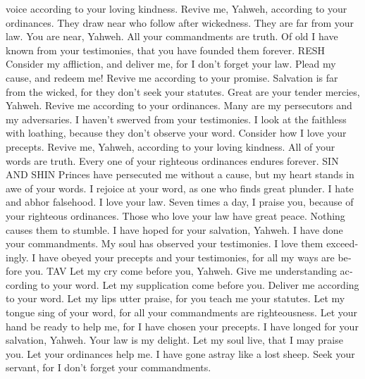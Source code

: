 \begin{paracol}{2}
\begin{otherlanguage}{english}
voice according to your loving kindness. Revive me, Yahweh, according to
your ordinances.  They draw near who follow after
wickedness. They are far from your law.  You are near,
Yahweh. All your commandments are truth.  Of old I have
known from your testimonies, that you have founded them forever. RESH
 Consider my affliction, and deliver me, for I don't
forget your law.  Plead my cause, and redeem me! Revive
me according to your promise.  Salvation is far from the
wicked, for they don't seek your statutes.  Great are
your tender mercies, Yahweh. Revive me according to your ordinances.
 Many are my persecutors and my adversaries. I haven't
swerved from your testimonies.  I look at the faithless
with loathing, because they don't observe your word. 
Consider how I love your precepts. Revive me, Yahweh, according to your
loving kindness.  All of your words are truth. Every one
of your righteous ordinances endures forever. SIN AND SHIN
 Princes have persecuted me without a cause, but my
heart stands in awe of your words.  I rejoice at your
word, as one who finds great plunder.  I hate and abhor
falsehood. I love your law.  Seven times a day, I praise
you, because of your righteous ordinances.  Those who
love your law have great peace. Nothing causes them to stumble.
 I have hoped for your salvation, Yahweh. I have done
your commandments.  My soul has observed your
testimonies. I love them exceedingly.  I have obeyed
your precepts and your testimonies, for all my ways are before you. TAV
 Let my cry come before you, Yahweh. Give me
understanding according to your word.  Let my
supplication come before you. Deliver me according to your word.
 Let my lips utter praise, for you teach me your
statutes.  Let my tongue sing of your word, for all your
commandments are righteousness.  Let your hand be ready
to help me, for I have chosen your precepts.  I have
longed for your salvation, Yahweh. Your law is my delight.
 Let my soul live, that I may praise you. Let your
ordinances help me.  I have gone astray like a lost
sheep. Seek your servant, for I don't forget your commandments.

\end{otherlanguage}


\end{paracol}
